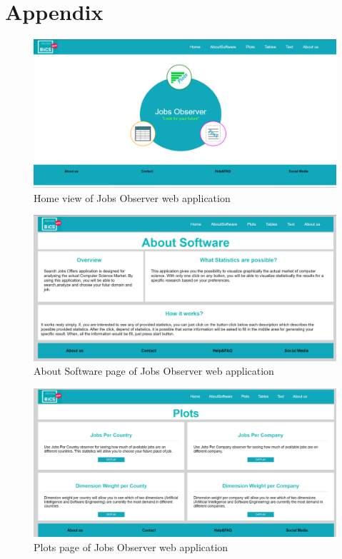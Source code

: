 \documentclass[conference,compsoc]{IEEEtran}
\begin{document}
\section{Appendix}

\begin{figure}[hbt!]
  \centering
	\includegraphics[scale=0.4]{home.png} 
	\caption{Home view of Jobs Observer web application}
\end{figure}

\begin{figure}[hbt!]
  \centering
	\includegraphics[scale=0.4]{aboutSoftware.png} 
	\caption{About Software page of Jobs Observer web application}
\end{figure}

\begin{figure}[hbt!]
  \centering
	\includegraphics[scale=0.4]{plots.png} 
	\caption{Plots page of Jobs Observer web application}
\end{figure}
\end{document}
